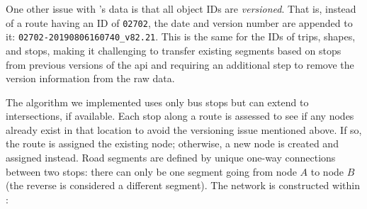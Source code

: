 One other issue with \AT{}'s \GTFS{} data is that all object IDs are \emph{versioned}. That is, instead of a route having an ID of \verb+02702+, the date and version number are appended to it: \verb+02702-20190806160740_v82.21+. This is the same for the IDs of trips, shapes, and stops, making it challenging to transfer existing segments based on stops from previous versions of the \gls{api} and requiring an additional step to remove the version information from the raw data.


The algorithm we implemented uses only bus stops but can extend to intersections, if available. Each stop along a route is assessed to see if any nodes already exist in that location to avoid the versioning issue mentioned above. If so, the route is assigned the existing node; otherwise, a new node is created and assigned instead. Road segments are defined by unique one-way connections between two stops: there can only be one segment going from node $A$ to node $B$ (the reverse is considered a different segment). The network is constructed within :
\begin{knitrout}\small
{}\color{fgcolor}
\end{knitrout}
